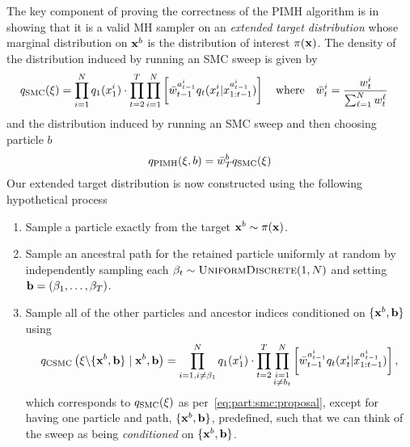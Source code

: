 The key component of proving the correctness of the PIMH algorithm is in showing that it is a valid
MH sampler on an \emph{extended target distribution} whose marginal distribution on $\mathbf{x}^b$ is the distribution of interest $\pi(\mathbf{x})$.
The density of the distribution induced by running an SMC sweep is given by
\begin{align}
\label{eq:part:smc:proposal}
q_{\text{SMC}}(\mathbf{\xi}) &= \prod_{i=1}^N q_1(x_{1}^i) \cdot \prod_{t=2}^T \prod_{i=1}^N \left[ 
\bar w_{t-1}^{a_{t-1}^i}
q_t(x_{t}^i|x_{1:t-1}^{a_{t-1}^i}) \right]  \quad \text{where} \quad \bar{w}_t^i = \frac{{w}_t^i}{\sum_{\ell=1}^{N}w_t^{\ell}}
\end{align}
and the distribution induced by running an SMC sweep and then choosing particle $b$
\begin{align}
q_{\text{PIMH}}(\mathbf{\xi},b) = \bar{w}_T^b q_{\text{SMC}}(\mathbf{\xi})
\end{align}
Our extended target distribution is now constructed using the following hypothetical process
\begin{enumerate}
	\setlength\itemsep{-0.1em}
	\item Sample a particle exactly from the target $\mathbf{x}^b \sim \pi(\mathbf{x})$.
	\item Sample an ancestral path for the retained particle uniformly at random by independently sampling each $\beta_t \sim \textsc{UniformDiscrete}(1,N)$ and setting $\mathbf{b} = (\beta_1,\dots,\beta_T)$.
	\item Sample all of the other particles and ancestor indices conditioned on $\{\mathbf{x}^{b},\mathbf{b}\}$ using
		\begin{align}
	\label{eq:part:csmc}
	q_{\text{CSMC}}\left(\mathbf{\xi} \backslash \{\mathbf{x}^b, \mathbf{b}\} \mid \mathbf{x}^b, \mathbf{b} \right) = 
	\prod_{i=1, i\neq\beta_1}^N  q_1(x_{1}^i) \cdot \prod_{t=2}^T \prod_{\substack{i=1\\i\neq b_{t}}}^N \left[
	\bar w_{t-1}^{a_{t-1}^i}q_t(x_{t}^i|x_{1:t-1}^{a_{t-1}^i})\right],
	\end{align}
	which corresponds to $q_{\text{SMC}}(\mathbf{\xi})$ as per~\eqref{eq:part:smc:proposal},
	except for having one particle and path, $\{\mathbf{x}^{b},\mathbf{b}\}$, predefined, such that we can think
	of the sweep as being \emph{conditioned} on $\{\mathbf{x}^{b},\mathbf{b}\}$.
\end{enumerate}
